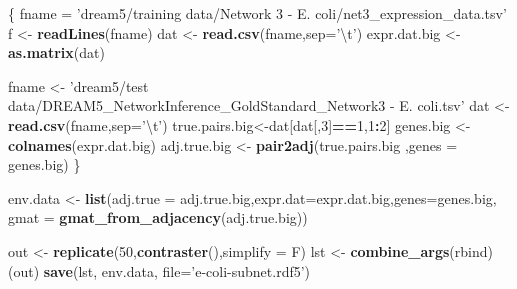 \documentclass[]{article}
\newenvironment{Shaded}{\begin{snugshade}}{\end{snugshade}}
\newcommand{\KeywordTok}[1]{\textcolor[rgb]{0.13,0.29,0.53}{\textbf{#1}}}
\newcommand{\DataTypeTok}[1]{\textcolor[rgb]{0.13,0.29,0.53}{#1}}
\newcommand{\DecValTok}[1]{\textcolor[rgb]{0.00,0.00,0.81}{#1}}
\newcommand{\CharTok}[1]{\textcolor[rgb]{0.31,0.60,0.02}{#1}}
\newcommand{\StringTok}[1]{\textcolor[rgb]{0.31,0.60,0.02}{#1}}
\newcommand{\OperatorTok}[1]{\textcolor[rgb]{0.81,0.36,0.00}{\textbf{#1}}}
\newcommand{\NormalTok}[1]{#1}
\theoremstyle{definition}
\theoremstyle{definition}
\theoremstyle{definition}
\theoremstyle{remark}
\begin{document}
\begin{Shaded}
\begin{Highlighting}[]
\NormalTok{\{}
\NormalTok{  fname =}\StringTok{ 'dream5/training data/Network 3 - E. coli/net3_expression_data.tsv'}
\NormalTok{  f <-}\StringTok{ }\KeywordTok{readLines}\NormalTok{(fname)}
\NormalTok{  dat <-}\StringTok{ }\KeywordTok{read.csv}\NormalTok{(fname,}\DataTypeTok{sep=}\StringTok{'}\CharTok{\textbackslash{}t}\StringTok{'}\NormalTok{)}
\NormalTok{  expr.dat.big <-}\StringTok{ }\KeywordTok{as.matrix}\NormalTok{(dat)}
  
  
\NormalTok{  fname <-}\StringTok{ 'dream5/test data/DREAM5_NetworkInference_GoldStandard_Network3 - E. coli.tsv'}
\NormalTok{  dat <-}\StringTok{ }\KeywordTok{read.csv}\NormalTok{(fname,}\DataTypeTok{sep=}\StringTok{'}\CharTok{\textbackslash{}t}\StringTok{'}\NormalTok{)}
\NormalTok{  true.pairs.big<-dat[dat[,}\DecValTok{3}\NormalTok{]}\OperatorTok{==}\DecValTok{1}\NormalTok{,}\DecValTok{1}\OperatorTok{:}\DecValTok{2}\NormalTok{]}
\NormalTok{  genes.big <-}\StringTok{ }\KeywordTok{colnames}\NormalTok{(expr.dat.big)}
\NormalTok{  adj.true.big <-}\StringTok{ }\KeywordTok{pair2adj}\NormalTok{(true.pairs.big ,}\DataTypeTok{genes =}\NormalTok{ genes.big)}
\NormalTok{\}}

\NormalTok{env.data <-}\StringTok{ }\KeywordTok{list}\NormalTok{(}\DataTypeTok{adj.true =}\NormalTok{ adj.true.big,}\DataTypeTok{expr.dat=}\NormalTok{expr.dat.big,}\DataTypeTok{genes=}\NormalTok{genes.big,}
                 \DataTypeTok{gmat =} \KeywordTok{gmat_from_adjacency}\NormalTok{(adj.true.big))}

\NormalTok{out <-}\StringTok{ }\KeywordTok{replicate}\NormalTok{(}\DecValTok{50}\NormalTok{,}\KeywordTok{contraster}\NormalTok{(),}\DataTypeTok{simplify =}\NormalTok{ F)}
\NormalTok{lst <-}\StringTok{ }\KeywordTok{combine_args}\NormalTok{(rbind)(out)}
\KeywordTok{save}\NormalTok{(lst, env.data, }\DataTypeTok{file=}\StringTok{'e-coli-subnet.rdf5'}\NormalTok{)}
\end{Highlighting}
\end{Shaded}
\end{document}
